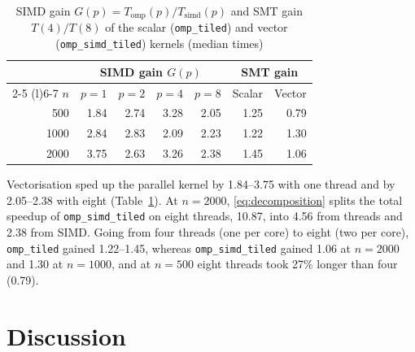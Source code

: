 \documentclass[conference,a4paper]{IEEEtran}
\newcommand{\code}[1]{\texttt{#1}}
\newcommand{\ompk}{\code{omp\_tiled}}
\newcommand{\simdk}{\code{omp\_simd\_tiled}}
\begin{document}
\begin{table}[t]
  \centering
  \caption{SIMD gain $G(p) = T_{\mathrm{omp}}(p)/T_{\mathrm{simd}}(p)$ and SMT
           gain $T(4)/T(8)$ of the scalar (\ompk) and vector (\simdk)
           kernels (median times)}
  \label{tab:gains}
  \footnotesize
  \setlength{\tabcolsep}{4.3pt}
  \begin{tabular}{@{}rrrrrrr@{}}
    \toprule
    & \multicolumn{4}{c}{\textbf{SIMD gain $G(p)$}} & \multicolumn{2}{c}{\textbf{SMT gain}} \\
    \cmidrule(lr){2-5} \cmidrule(l){6-7}
    $n$ & $p=1$ & $p=2$ & $p=4$ & $p=8$ & Scalar & Vector \\
    \midrule
    500  & 1.84 & 2.74 & 3.28 & 2.05 & 1.25 & 0.79 \\
    1000 & 2.84 & 2.83 & 2.09 & 2.23 & 1.22 & 1.30 \\
    2000 & 3.75 & 2.63 & 3.26 & 2.38 & 1.45 & 1.06 \\
    \bottomrule
  \end{tabular}
\end{table}

Vectorisation sped up the parallel kernel by 1.84--3.75 with one thread and by
2.05--2.38 with eight (Table~\ref{tab:gains}). At $n = 2000$, \eqref{eq:decomposition}
splits the total speedup of \simdk{} on eight threads, 10.87, into 4.56 from
threads and 2.38 from SIMD. Going from four threads (one per core) to eight
(two per core), \ompk{} gained 1.22--1.45, whereas \simdk{} gained 1.06 at
$n = 2000$ and 1.30 at $n = 1000$, and at $n = 500$ eight threads took 27\%
longer than four (0.79).

\section{Discussion}
\label{sec:discussion}
\end{document}
